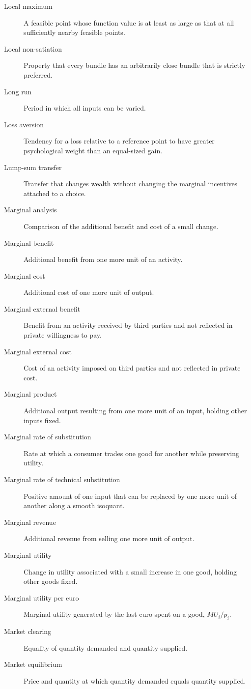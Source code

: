\begin{description}
  \item[Local maximum] A feasible point whose function value is at least as
  large as that at all sufficiently nearby feasible points.
  \item[Local non-satiation] Property that every bundle has an arbitrarily close bundle that is strictly preferred.
  \item[Long run] Period in which all inputs can be varied.
  \item[Loss aversion] Tendency for a loss relative to a reference point to have greater psychological weight than an equal-sized gain.
  \item[Lump-sum transfer] Transfer that changes wealth without changing the marginal incentives attached to a choice.
  \item[Marginal analysis] Comparison of the additional benefit and cost of a small change.
  \item[Marginal benefit] Additional benefit from one more unit of an activity.
  \item[Marginal cost] Additional cost of one more unit of output.
  \item[Marginal external benefit] Benefit from an activity received by third parties and not reflected in private willingness to pay.
  \item[Marginal external cost] Cost of an activity imposed on third parties and not reflected in private cost.
  \item[Marginal product] Additional output resulting from one more unit of an input, holding other inputs fixed.
  \item[Marginal rate of substitution] Rate at which a consumer trades one good for another while preserving utility.
  \item[Marginal rate of technical substitution] Positive amount of one input that can be replaced by one more unit of another along a smooth isoquant.
  \item[Marginal revenue] Additional revenue from selling one more unit of output.
  \item[Marginal utility] Change in utility associated with a small increase in one good, holding other goods fixed.
  \item[Marginal utility per euro] Marginal utility generated by the last euro spent on a good, $MU_i/p_i$.
  \item[Market clearing] Equality of quantity demanded and quantity supplied.
  \item[Market equilibrium] Price and quantity at which quantity demanded equals quantity supplied.

\end{description}
